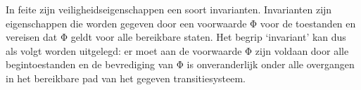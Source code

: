 \documentclass{article}
\begin{document}
	
	In feite zijn veiligheidseigenschappen  een soort invarianten. Invarianten
	zijn eigenschappen die worden gegeven door een voorwaarde Φ voor de toestanden en vereisen dat Φ geldt 	voor alle bereikbare staten.
	Het begrip ‘invariant’ kan dus als volgt worden uitgelegd: er moet aan de voorwaarde Φ zijn voldaan
	door alle begintoestanden en de bevrediging van Φ is onveranderlijk onder alle overgangen in het bereikbare 	pad van het gegeven transitiesysteem. 
	
\end{document}
